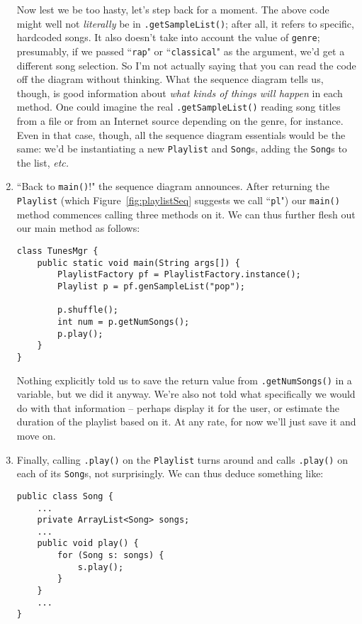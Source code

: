 \begin{enumerate}
Now lest we be too hasty, let's step back for a moment. The above code
might well not \textit{literally} be in \texttt{.getSampleList()}; after all,
it refers to specific, hardcoded songs. It also doesn't take into account the
value of \texttt{genre}; presumably, if we passed ``\texttt{rap}" or
``\texttt{classical}" as the argument, we'd get a different song selection. So
I'm not actually saying that you can read the code off the diagram without
thinking. What the sequence diagram tells us, though, is good information
about \textit{what kinds of things will happen} in each method. One could
imagine the real \texttt{.getSampleList()} reading song titles from a file or
from an Internet source depending on the genre, for instance. Even in that
case, though, all the sequence diagram essentials would be the same: we'd be
instantiating a new \texttt{Playlist} and \texttt{Song}s, adding the
\texttt{Song}s to the list, \textit{etc.}

\item ``Back to \texttt{main()}!" the sequence diagram announces. After
returning the \texttt{Playlist} (which Figure~\ref{fig:playlistSeq} suggests
we call ``\texttt{pl}") our \texttt{main()} method commences calling three
methods on it. We can thus further flesh out our main method as follows:

\begin{Verbatim}[fontsize=\footnotesize,samepage=true,frame=single]
class TunesMgr {
    public static void main(String args[]) {
        PlaylistFactory pf = PlaylistFactory.instance();
        Playlist p = pf.genSampleList("pop");

        p.shuffle();
        int num = p.getNumSongs();
        p.play();
    }
}
\end{Verbatim}

Nothing explicitly told us to save the return value from
\texttt{.getNumSongs()} in a variable, but we did it anyway. We're also not
told what specifically we would do with that information -- perhaps display it
for the user, or estimate the duration of the playlist based on it. At any
rate, for now we'll just save it and move on.

\item Finally, calling \texttt{.play()} on the \texttt{Playlist} turns around
and calls \texttt{.play()} on each of its \texttt{Song}s, not surprisingly. We
can thus deduce something like:

\begin{Verbatim}[fontsize=\footnotesize,samepage=true,frame=single]
public class Song {
    ...
    private ArrayList<Song> songs;
    ...
    public void play() {
        for (Song s: songs) {
            s.play();
        }         
    }
    ...
}
\end{Verbatim}


\end{enumerate}
